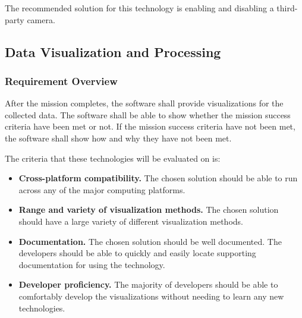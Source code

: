 \documentclass[letterpaper,10pt]{article}
\begin{document}
The recommended solution for this technology is enabling and disabling a third-party camera.

\subsection{Data Visualization and Processing}
\subsubsection{Requirement Overview}
After the mission completes, the software shall provide visualizations for the collected data.
The software shall be able to show whether the mission success criteria have been met or not.
If the mission success criteria have not been met, the software shall show how and
why they have not been met.

The criteria that these technologies will be evaluated on is:
\begin{itemize}
\item \textbf{Cross-platform compatibility.}
The chosen solution should be able to run across any of the major computing platforms.

\item \textbf{Range and variety of visualization methods.}
The chosen solution should have a large variety of different visualization methods.

\item \textbf{Documentation.}
The chosen solution should be well documented.
The developers should be able to quickly and easily locate supporting documentation for using the technology.

\item \textbf{Developer proficiency.}
The majority of developers should be able to comfortably develop the visualizations
without needing to learn any new technologies.
\end{itemize}
\end{document}
